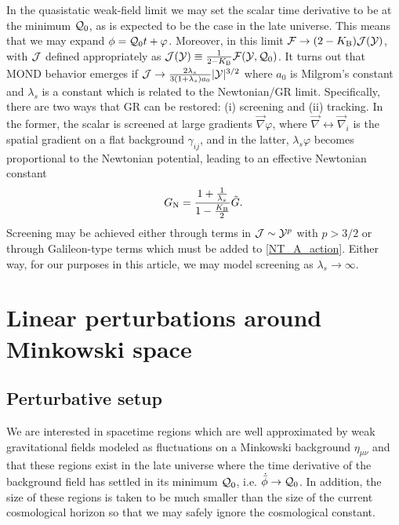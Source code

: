 \documentclass[twocolumn,prd,preprintnumbers,amsmath,amssymb,nofootinbib,superscriptaddress]{revtex4-1}
\newcommand{\grad}{\ensuremath{\vec{\nabla}}}
\newcommand{\phib}{{\bar{\phi}}}
\newcommand{\lambdas}{\lambda_s}
\newcommand{\Fcal}{{\cal F}}
\newcommand{\Qcal}{{\cal Q}}
\newcommand{\Ycal}{{\cal Y}}
\newcommand{\Jcal}{{\cal J}}
\newcommand{\Gt}{\ensuremath{\tilde{G}}}
\newcommand{\GN}{\ensuremath{G_{{\rm N}}}}
\newcommand{\KB}{\ensuremath{K_{{\rm B}}}}
\begin{document}
In the quasistatic weak-field limit we may set the scalar time derivative to be at the minimum $\Qcal_0$, as is expected to be the case in the late universe.
This means that we may expand $\phi = \Qcal_0 t + \varphi$. Moreover, in this limit $\Fcal \rightarrow  (2-\KB) \Jcal(\Ycal)$, with $\Jcal$ defined appropriately as
$\Jcal(\Ycal) \equiv \frac{1}{2 -\KB} \Fcal(\Ycal,\Qcal_0)$.
It turns out that MOND behavior emerges if $\Jcal \rightarrow \frac{2\lambdas}{3(1+\lambdas) a_0} |\Ycal|^{3/2}$ where
$a_0$ is Milgrom's constant and $\lambdas$ is a constant which is related to the Newtonian/GR limit. Specifically, there are two ways that GR can be restored: (i) screening 
and (ii) tracking.
In the former, the scalar is screened at large gradients $\grad \varphi$, where $\grad \leftrightarrow \grad_i$ is the spatial gradient on a flat background $\gamma_{ij}$,
and in the latter, $\lambdas \varphi$ becomes proportional to the Newtonian potential, leading to an effective Newtonian constant 
\begin{equation}
\GN = \frac{1 + \frac{1}{\lambdas}}{ 1 - \frac{\KB}{2} } \Gt.
\end{equation}
Screening may be achieved either through terms in $\Jcal \sim \Ycal^p$ with $p>3/2$ or through Galileon-type terms which must be added to \eqref{NT_A_action}. Either way, for our purposes in this article,
we may model screening as $\lambdas \rightarrow \infty$. 



%
\section{Linear perturbations around Minkowski space}
\label{Sec_Linear}
%
\subsection{Perturbative setup}
We are interested in spacetime regions which are well approximated by weak gravitational fields modeled as fluctuations on a Minkowski background $\eta_{\mu\nu}$ and that these regions
exist in the late universe where the time derivative of the background field has settled in its minimum $\Qcal_0$, i.e. $\dot{\phib} \rightarrow \Qcal_0$.
In addition, the size of these regions is taken to be much smaller than the size of the current cosmological horizon so that we may safely ignore the cosmological constant.
\end{document}
